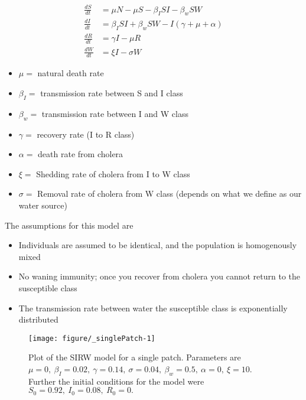 \documentclass[12pt]{article}\usepackage[]{graphicx}\usepackage[]{color}
\makeatletter
\def\maxwidth{ %
  \ifdim\Gin@nat@width>\linewidth
    \linewidth
  \else
    \Gin@nat@width
  \fi
}
\newenvironment{kframe}{%
 \def\at@end@of@kframe{}%
 \ifinner\ifhmode%
  \def\at@end@of@kframe{\end{minipage}}%
  \begin{minipage}{\columnwidth}%
 \fi\fi%
 \def\FrameCommand##1{\hskip\@totalleftmargin \hskip-\fboxsep
 \colorbox{shadecolor}{##1}\hskip-\fboxsep
     \hskip-\linewidth \hskip-\@totalleftmargin \hskip\columnwidth}%
 \MakeFramed {\advance\hsize-\width
   \@totalleftmargin\z@ \linewidth\hsize
   \@setminipage}}%
 {\par\unskip\endMakeFramed%
 \at@end@of@kframe}
\newenvironment{knitrout}{}{} %
\makeatother
\begin{document}
\begin{linenomath}
	\begin{align*}
		\frac{dS}{dt}&= \mu N - \mu S - \beta_I SI - \beta_w S W  \\
		\frac{dI}{dt}&= \beta_I S I + \beta_w S W - I (\gamma + \mu + \alpha) \\
		\frac{dR}{dt}&= \gamma I - \mu R \\
		\frac{dW}{dt}&= \xi I  - \sigma W
	\end{align*}
\end{linenomath}
\begin{itemize}
    \item$\mu=$ natural death rate
    \item$\beta_I=$ transmission rate between S and I class
    \item$\beta_w=$ transmission rate between I and W class
    \item$\gamma=$ recovery rate (I to R class)
    \item$\alpha=$ death rate from cholera
    \item$\xi=$ Shedding rate of cholera from I to W class
    \item$\sigma=$	Removal rate of cholera from W class (depends on what we define as our water source)
\end{itemize}
The assumptions for this model are
\begin{itemize}
    \item Individuals are assumed to be identical, and the population is homogenously mixed
    \item No waning immunity; once you recover from cholera you cannot return to the susceptible class
    \item The transmission rate between water the susceptible class  is exponentially distributed
\end{itemize}

\begin{knitrout}
\color{fgcolor}\begin{kframe}


{\ttfamily\noindent\itshape\color{messagecolor}{\#\# Loading required package: rootSolve}}

{\ttfamily\noindent\itshape\color{messagecolor}{\#\# Loading required package: shape}}\end{kframe}\begin{figure}[h]
\texttt{[image: figure/\_singlePatch-1]} \caption{\label{fig:singlepatch} Plot of the SIRW model for a single patch. Parameters are $\mu=0,\ \beta_I=0.02,\ \gamma=0.14,\ \sigma=0.04,\ \beta_w=0.5,\ \alpha=0,\ \xi=10$. Further the initial conditions for the model were $S_0=0.92,\ I_0=0.08,\ R_0=0.$}\label{fig:<singlePatch}
\end{figure}


\end{knitrout}
\FloatBarrier
\end{document}
